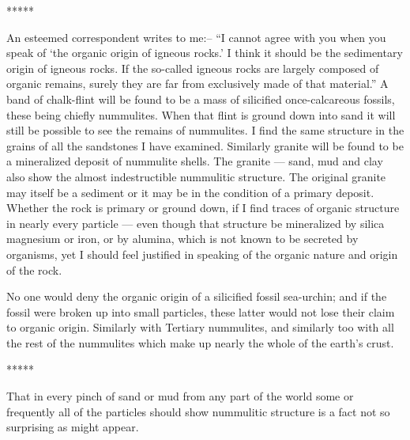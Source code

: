 \documentclass[a4paper, 12pt, oneside]{article}
\begin{document}
\centerline{*\hspace{15mm}*\hspace{15mm}*\hspace{15mm}*\hspace{15mm}*}
\bigskip

An esteemed correspondent writes to me:-- ``I cannot agree with you when you speak of `the organic origin of igneous rocks.' I think it should be the sedimentary origin of igneous rocks. If the so-called igneous rocks are largely composed of organic remains, surely they are far from exclusively made of that material.'' A band of chalk-flint will be found to be a mass of silicified once-calcareous fossils, these being chiefly nummulites. When that flint is ground down into sand it will still be possible to see the remains of nummulites. I find the same structure in the grains of all the sandstones I have examined. Similarly granite will be found to be a mineralized deposit of nummulite shells. The granite --- sand, mud and clay also show the almost indestructible nummulitic structure. The original granite may itself be a sediment or it may be in the condition of a primary deposit. Whether the rock is primary or ground down, if I find traces of organic structure in nearly every particle --- even though that structure be mineralized by silica magnesium or iron, or by alumina, which is not known to be secreted by organisms, yet I should feel justified in speaking of the organic nature and origin of the rock.

No one would deny the organic origin of a silicified fossil sea-urchin; and if the fossil were broken up into small particles, these latter would not lose their claim to organic origin. Similarly with Tertiary nummulites, and similarly too with all the rest of the nummulites which make up nearly the whole of the earth's crust.

\centerline{*\hspace{15mm}*\hspace{15mm}*\hspace{15mm}*\hspace{15mm}*}
\bigskip

That in every pinch of sand or mud from any part of the world some or frequently all of the particles should show nummulitic structure is a fact not so surprising as might appear.
\end{document}
